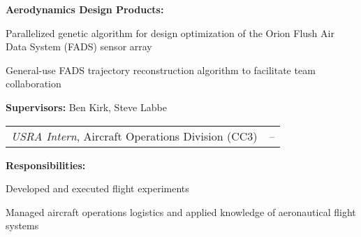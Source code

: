 \documentclass[10pt,letterpaper,MMMyyyy,nonstop]{simpleresumecv}
\makeatletter
\newcommand{\headerrow}[2]
{\begin{tabular*}{\linewidth}{l@{\extracolsep{\fill}}r}
    #1 &
    #2 \\
\end{tabular*}}
\makeatother
\begin{document}
\begin{itemize}
\begin{itemize*}
            \item \textbf{Aerodynamics Design Products:}
            \begin{itemize*}
                \item Parallelized genetic algorithm for design optimization of the Orion Flush Air Data System (FADS) sensor array
                \item General-use FADS trajectory reconstruction algorithm to facilitate team collaboration
            \end{itemize*}

            \item \textbf{Supervisors:} Ben Kirk, Steve Labbe
        \end{itemize*}

        \headerrow
        {\emph{USRA Intern}, Aircraft Operations Division (CC3)}
        {\emph{\DatestampYMD{2013}{07}{08} -- \DatestampYMD{2013}{09}{13}}}

        \begin{itemize*}
            \item \textbf{Responsibilities:}
            \begin{itemize*}
                \item Developed and executed flight experiments
                \item Managed aircraft operations logistics and applied knowledge of aeronautical flight systems
            \end{itemize*}


\end{itemize*}
\end{itemize}
\end{document}
